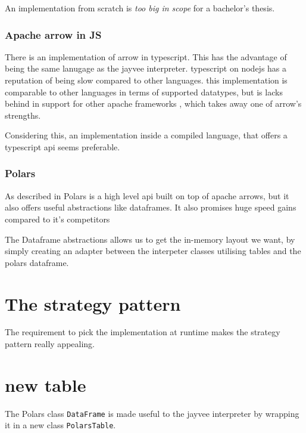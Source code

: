 An implementation from scratch is \emph{too big in scope} for a bachelor's thesis.

\subsubsection{Apache arrow in JS}
\label{subsubsection:arrow_in_js}
There is an implementation of arrow in typescript.
This has the advantage of being the same lanugage as the jayvee interpreter.
typescript on nodejs has a reputation of being slow compared to other languages. %
this implementation is comparable to other languages in terms of supported datatypes, but is lacks behind in support for other apache frameworks \autocite{arrow:status}, which takes away one of arrow's strengths.

Considering this, an implementation inside a compiled language, that offers a typescript api seems preferable.

\subsubsection{Polars}
\label{subsection:polars}
As described in %
Polars is a high level api built on top of apache arrows, but it also offers useful abstractions like dataframes.
It also promises huge %
speed gains compared to it's competitors %


The Dataframe abstractions allows us to get the in-memory layout we want, by simply creating an adapter %
between the interpeter classes utilising tables and the polars dataframe.


\section{The strategy pattern}
The requirement to pick the implementation at runtime makes the strategy pattern really appealing. %

\section{new table} %
\label{section:new_table}


The Polars class \Verb|DataFrame| is made useful to the jayvee interpreter by wrapping it in a new class \Verb|PolarsTable|.

